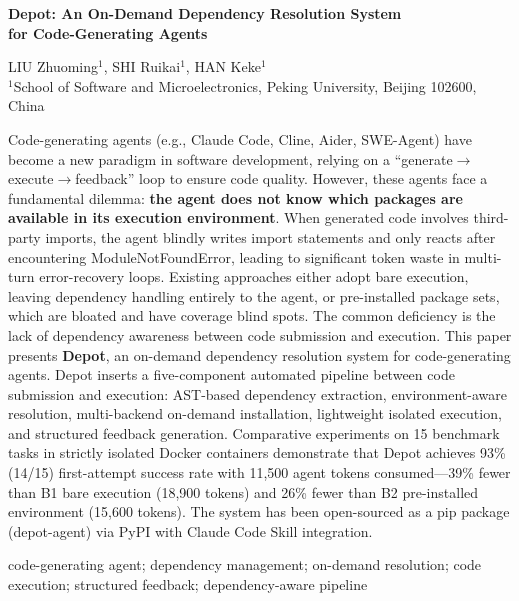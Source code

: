 \documentclass[10pt]{ctexart}
\begin{document}
\vspace{0.5cm}
\begin{center}
{\LARGE\bfseries Depot: An On-Demand Dependency Resolution System\\ for Code-Generating Agents}
\vspace{0.3cm}

\small
LIU Zhuoming$^1$, SHI Ruikai$^1$, HAN Keke$^1$ \\[2mm]
\footnotesize
$^1$School of Software and Microelectronics, Peking University, Beijing 102600, China
\end{center}

\vspace{0.3cm}
\ignorespaces
Code-generating agents (e.g., Claude Code, Cline, Aider, SWE-Agent) have become a new paradigm in software development, relying on a ``generate$\rightarrow$execute$\rightarrow$feedback'' loop to ensure code quality. However, these agents face a fundamental dilemma: \textbf{the agent does not know which packages are available in its execution environment}. When generated code involves third-party imports, the agent blindly writes import statements and only reacts after encountering ModuleNotFoundError, leading to significant token waste in multi-turn error-recovery loops. Existing approaches either adopt bare execution, leaving dependency handling entirely to the agent, or pre-installed package sets, which are bloated and have coverage blind spots. The common deficiency is the lack of dependency awareness between code submission and execution. This paper presents \textbf{Depot}, an on-demand dependency resolution system for code-generating agents. Depot inserts a five-component automated pipeline between code submission and execution: AST-based dependency extraction, environment-aware resolution, multi-backend on-demand installation, lightweight isolated execution, and structured feedback generation. Comparative experiments on 15 benchmark tasks in strictly isolated Docker containers demonstrate that Depot achieves 93\% (14/15) first-attempt success rate with 11,500 agent tokens consumed—39\% fewer than B1 bare execution (18,900 tokens) and 26\% fewer than B2 pre-installed environment (15,600 tokens). The system has been open-sourced as a pip package (depot-agent) via PyPI with Claude Code Skill integration.

\medskip
{} code-generating agent; dependency management; on-demand resolution; code execution; structured feedback; dependency-aware pipeline
\end{document}
